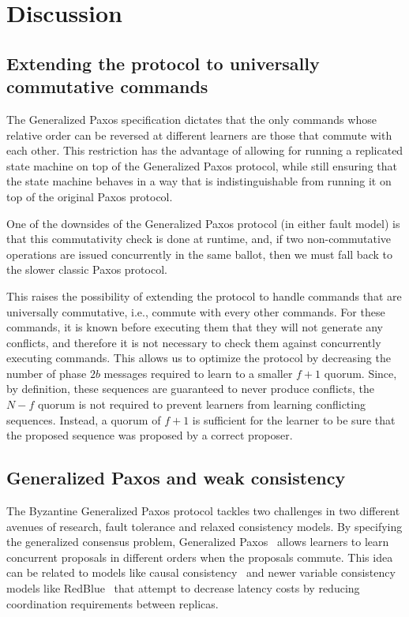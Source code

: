 \section{Discussion}
\label{sec:disc}

\subsection{Extending the protocol to universally commutative commands}

The Generalized Paxos specification dictates that the only commands
whose relative order can be reversed at different learners are those
that commute with each other. This restriction has the advantage of
allowing for running a replicated state machine on top of the
Generalized Paxos protocol, while still ensuring that the state
machine behaves in a way that is indistinguishable from running it on
top of the original Paxos protocol.

One of the downsides of the Generalized Paxos protocol (in either
fault model) is that this commutativity check is done at runtime,
and, if two non-commutative operations are issued concurrently in
the same ballot, then we must fall back to the slower
classic Paxos protocol.

This raises the possibility of extending the protocol to handle
commands that are universally commutative, i.e., commute with every
other commands. For these commands, it is known before executing them
that they will not generate any conflicts, and therefore it is not
necessary to check them against concurrently executing commands.  This
allows us to optimize the protocol by decreasing the number of phase
$2b$ messages required to learn to a smaller $f+1$ quorum. Since, by
definition, these sequences are guaranteed to never produce conflicts,
the $N-f$ quorum is not required to prevent learners from learning
conflicting sequences. Instead, a quorum of $f+1$ is sufficient for
the learner to be sure that the proposed sequence was proposed by a
correct proposer.


\subsection{Generalized Paxos and weak consistency}


The Byzantine Generalized Paxos protocol tackles two challenges in two different avenues of research, fault tolerance and relaxed consistency models. By specifying the generalized consensus problem, Generalized Paxos~\cite{Lamport2005} allows learners to learn concurrent proposals in different orders when the proposals commute. This idea can be related to models like causal consistency~\cite{Ahamad1995} and newer variable consistency models like RedBlue~\cite{Li2012} that attempt to decrease latency costs by reducing coordination requirements between replicas. 



